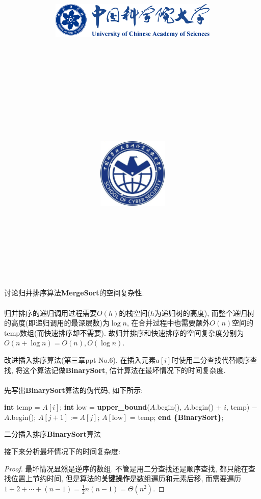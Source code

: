 \documentclass{article}
\title{
	\includegraphics[width=0.6\textwidth]{images/title/ucas_logo 1.pdf}\\
    \vspace{1in}
    \textmd{\textbf{\hmwkClass}}\\
	\textmd{\Large{\textbf{\hmwkClassID}}}\\
    \textmd{\textbf{\hmwkTitle}}\\
    \normalsize\vspace{0.1in}\large{\hmwkCompleteTime }\\
    \vspace{0.1in}\large{\textit{\hmwkClassInstructor\ }}\\
    \vspace{1in}
	\includegraphics[width=0.25\textwidth]{images/title/Cyber.jpg}\\
	\vspace{1in}
}
\author{
	\hmwkAuthorName \\ 
	\hmwkAuthorStuID \\
	\hmwkAuthorInst \\
	\hmwkAuthorzhuanye \\
	\hmwkAuthorfangxiang
	}
\date{}
\begin{document}
\maketitle


%
%
%
%
%


\pagebreak


\begin{homeworkProblem}
	讨论归并排序算法\textbf{MergeSort}的空间复杂性.
	\\

	\solution
	\\

	归并排序的递归调用过程需要$O(h)$的栈空间($h$为递归树的高度), 而整个递归树的高度(即递归调用的最深层数)为$\log n$, 在合并过程中也需要额外$O(n)$空间的temp数组(而快速排序却不需要). 故归并排序和快速排序的空间复杂度分别为$O(n + \log n)=O(n), O(\log n)$.
\end{homeworkProblem}


\begin{homeworkProblem} \label{Problem:BinarySort}
	改进插入排序算法(第三章ppt No.6), 在插入元素$a[i]$时使用二分查找代替顺序查找, 将这个算法记做\textbf{BinarySort}, 估计算法在最坏情况下的时间复杂度. 
	\\

	\solution
	\\

	先写出\textbf{BinarySort}算法的伪代码, 如下所示: 
	\begin{algorithm}[H]
		\begin{algorithmic}[1]
			\State \textbf{int} temp = $A[i]$; 
			\State \textbf{int} low = \textbf{upper_bound}($A$.begin(), $A$.begin() + $i$, temp) $-$ $A$.begin(); 
			 
					\State $A[j+1]:=A[j]$;
				\EndFor
				\State $A[\text{low}]$ = temp;
			\EndIf
		\EndFor
		\State \textbf{end \{BinarySort\}};
		\end{algorithmic}
		\caption{二分插入排序\textbf{BinarySort}算法}
		\label{alg:二分插入排序}
	\end{algorithm}
接下来分析最坏情况下的时间复杂度:
\begin{proof}
	最坏情况显然是逆序的数组. 不管是用二分查找还是顺序查找, 都只能在查找位置上节约时间, 但是算法的\textbf{关键操作}是数组遍历和元素后移, 而需要遍历$1+2+\cdots + (n-1)=\frac{1}{2}n(n-1)=\Theta(n^2)$.
\end{proof}
\end{homeworkProblem}
\end{document}

